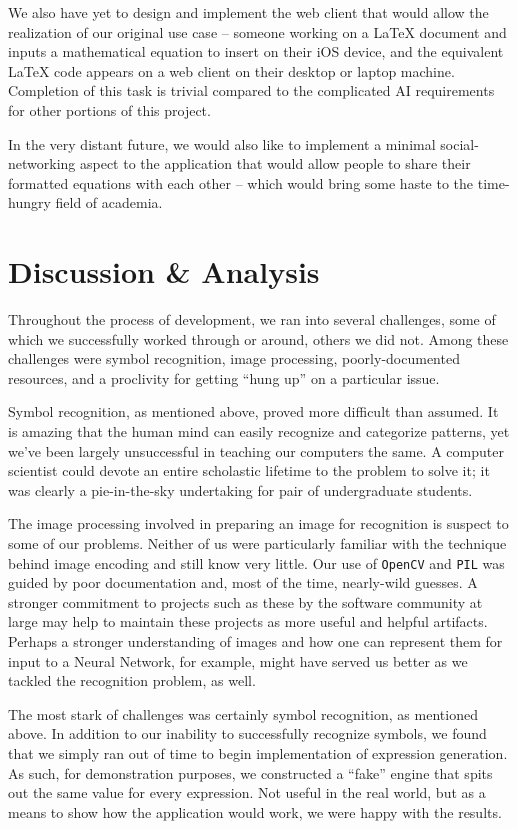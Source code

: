 \documentclass{acm_proc_article-sp}
\begin{document}
We also have yet to design and implement the web client that would allow the realization of our original use case -- someone working on a \LaTeX{}  document and inputs a mathematical equation to insert on their iOS device, and the equivalent \LaTeX{}  code appears on a web client on their desktop or laptop machine. Completion of this task is trivial compared to the complicated AI requirements for other portions of this project.

In the very distant future, we would also like to implement a minimal social-networking aspect to the application that would allow people to share their formatted equations with each other -- which would bring some haste to the time-hungry field of academia.

\section{Discussion \& Analysis}
Throughout the process of development, we ran into several challenges, some of which we successfully worked through or around, others we did not. Among these challenges were symbol recognition, image processing, poorly-documented resources, and a proclivity for getting ``hung up'' on a particular issue.

Symbol recognition, as mentioned above, proved more difficult than assumed. It is amazing that the human mind can easily recognize and categorize patterns, yet we've been largely unsuccessful in teaching our computers the same. A computer scientist could devote an entire scholastic lifetime to the problem to solve it; it was clearly a pie-in-the-sky undertaking for pair of undergraduate students.

The image processing involved in preparing an image for recognition is suspect to some of our problems. Neither of us were particularly familiar with the technique behind image encoding and still know very little. Our use of \texttt{OpenCV} and \texttt{PIL} was guided by poor documentation and, most of the time, nearly-wild guesses. A stronger commitment to projects such as these by the software community at large may help to maintain these projects as more useful and helpful artifacts. Perhaps a stronger understanding of images and how one can represent them for input to a Neural Network, for example, might have served us better as we tackled the recognition problem, as well.

The most stark of challenges was certainly symbol recognition, as mentioned above. In addition to our inability to successfully recognize symbols, we found that we simply ran out of time to begin implementation of expression generation. As such, for demonstration purposes, we constructed a ``fake'' engine that spits out the same value for every expression. Not useful in the real world, but as a means to show how the application would work, we were happy with the results.
\end{document}
